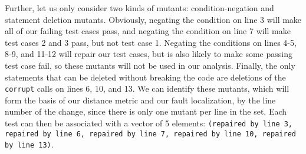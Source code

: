 Further, let us only consider two kinds of mutants:  condition-negation and statement deletion mutants.  Obviously, negating the condition on line 3 will make all of our failing test cases pass, and negating the condition on line 7 will make test cases 2 and 3 pass, but not test case 1.  Negating the conditions on lines 4-5, 8-9, and 11-12 will repair our test cases, but is also likely to make some passing test case fail, so these mutants will not be used in our analysis.  Finally, the only statements that can be deleted without breaking the code are deletions of the {\tt corrupt} calls on lines 6, 10, and 13.  We can identify these mutants, which will form the basis of our distance metric and our fault localization, by the line number of the change, since there is only one mutant per line in the set.  Each test can then be associated with a vector of 5 elements:  {\tt (repaired by line 3, repaired by line 6, repaired by line 7, repaired by line 10, repaired by line 13)}. 